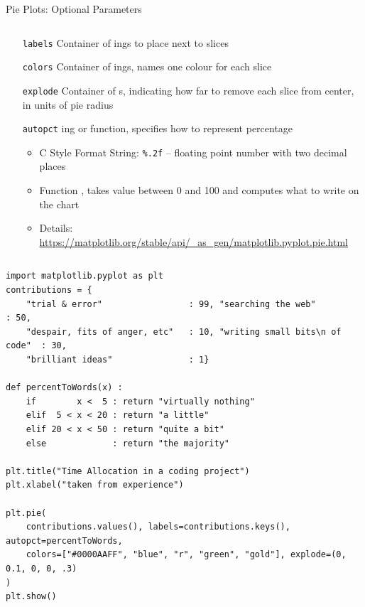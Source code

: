 \begin{frame}[fragile]{Pie Plots: Optional Parameters}
%
\begin{columns}
\begin{center}
\begin{itemize}
\item[\texttt{labels}] Container of ings to place next to slices
\item[\texttt{colors}] Container of ings, names one colour for each slice
\item[\texttt{explode}] Container of s, indicating how far to remove each slice from center, in units of pie radius
\item[\texttt{autopct}] ing or function, specifies how to represent percentage
	\begin{itemize}
	\item C Style Format String: \texttt{\%.2f} -- floating point number with two decimal places
	\item Function  \thus {}, takes value between 0 and 100 and computes what to write on the chart
	\item Details: \url{https://matplotlib.org/stable/api/_as_gen/matplotlib.pyplot.pie.html}
	\end{itemize}
\end{itemize}
\end{center}
\end{columns}
%
\end{frame}


\begin{frame}[fragile]
%
\vspace{-7pt}
\begin{codebox}
\begin{verbatim}
import matplotlib.pyplot as plt
contributions = {
    "trial & error"                 : 99, "searching the web"             : 50,
    "despair, fits of anger, etc"   : 10, "writing small bits\n of code"  : 30,
    "brilliant ideas"               : 1}

def percentToWords(x) :
    if        x <  5 : return "virtually nothing"
    elif  5 < x < 20 : return "a little"
    elif 20 < x < 50 : return "quite a bit"
    else             : return "the majority"

plt.title("Time Allocation in a coding project")
plt.xlabel("taken from experience")

plt.pie(
    contributions.values(), labels=contributions.keys(), autopct=percentToWords,
    colors=["#0000AAFF", "blue", "r", "green", "gold"], explode=(0, 0.1, 0, 0, .3)
)
plt.show()
\end{verbatim}
\end{codebox}
%
\end{frame}

